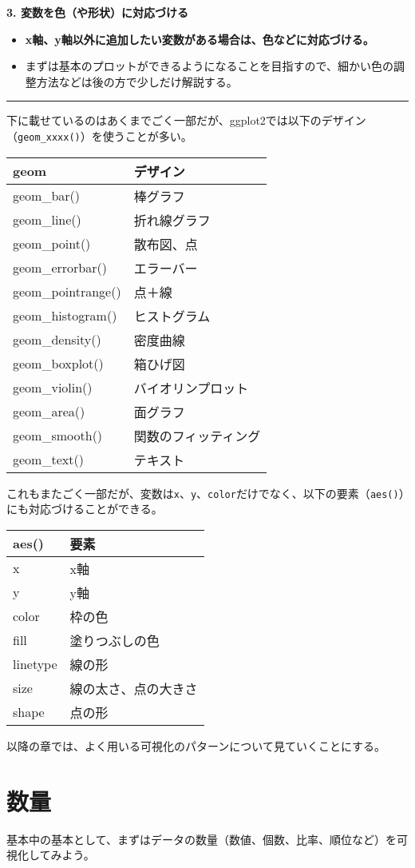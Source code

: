 \documentclass[]{book}
\begin{document}
\textbf{3. 変数を色（や形状）に対応づける}

\begin{itemize}
\item
  \textbf{x軸、y軸以外に追加したい変数がある場合は、色などに対応づける。}
\item
  まずは基本のプロットができるようになることを目指すので、細かい色の調整方法などは後の方で少しだけ解説する。
\end{itemize}

\begin{center}\rule{0.5\linewidth}{\linethickness}\end{center}

下に載せているのはあくまでごく一部だが、ggplot2では以下のデザイン（\texttt{geom\_xxxx()}）を使うことが多い。

\begin{longtable}[]{@{}ll@{}}
\toprule
geom & デザイン\tabularnewline
\midrule
\endhead
geom\_bar() & 棒グラフ\tabularnewline
geom\_line() & 折れ線グラフ\tabularnewline
geom\_point() & 散布図、点\tabularnewline
geom\_errorbar() & エラーバー\tabularnewline
geom\_pointrange() & 点＋線\tabularnewline
geom\_histogram() & ヒストグラム\tabularnewline
geom\_density() & 密度曲線\tabularnewline
geom\_boxplot() & 箱ひげ図\tabularnewline
geom\_violin() & バイオリンプロット\tabularnewline
geom\_area() & 面グラフ\tabularnewline
geom\_smooth() & 関数のフィッティング\tabularnewline
geom\_text() & テキスト\tabularnewline
\bottomrule
\end{longtable}

これもまたごく一部だが、変数は\texttt{x}、\texttt{y}、\texttt{color}だけでなく、以下の要素（\texttt{aes()}）にも対応づけることができる。

\begin{longtable}[]{@{}ll@{}}
\toprule
aes() & 要素\tabularnewline
\midrule
\endhead
x & x軸\tabularnewline
y & y軸\tabularnewline
color & 枠の色\tabularnewline
fill & 塗りつぶしの色\tabularnewline
linetype & 線の形\tabularnewline
size & 線の太さ、点の大きさ\tabularnewline
shape & 点の形\tabularnewline
\bottomrule
\end{longtable}

以降の章では、よく用いる可視化のパターンについて見ていくことにする。

\chapter{数量}\label{amount}

基本中の基本として、まずはデータの数量（数値、個数、比率、順位など）を可視化してみよう。
\end{document}
